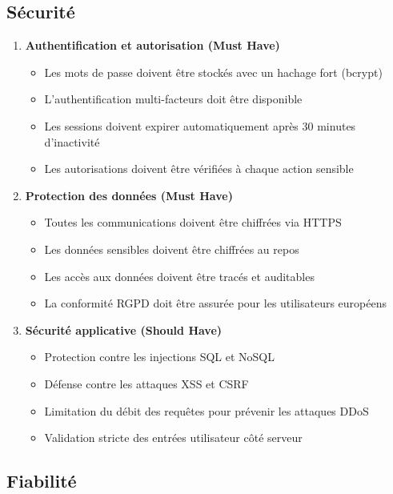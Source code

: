 \subsection{Sécurité}

\begin{enumerate}
    \item \textbf{Authentification et autorisation (Must Have)}
    \begin{itemize}
        \item Les mots de passe doivent être stockés avec un hachage fort (bcrypt)
        \item L'authentification multi-facteurs doit être disponible
        \item Les sessions doivent expirer automatiquement après 30 minutes d'inactivité
        \item Les autorisations doivent être vérifiées à chaque action sensible
    \end{itemize}
    
    \item \textbf{Protection des données (Must Have)}
    \begin{itemize}
        \item Toutes les communications doivent être chiffrées via HTTPS
        \item Les données sensibles doivent être chiffrées au repos
        \item Les accès aux données doivent être tracés et auditables
        \item La conformité RGPD doit être assurée pour les utilisateurs européens
    \end{itemize}
    
    \item \textbf{Sécurité applicative (Should Have)}
    \begin{itemize}
        \item Protection contre les injections SQL et NoSQL
        \item Défense contre les attaques XSS et CSRF
        \item Limitation du débit des requêtes pour prévenir les attaques DDoS
        \item Validation stricte des entrées utilisateur côté serveur
    \end{itemize}
\end{enumerate}

\subsection{Fiabilité}

